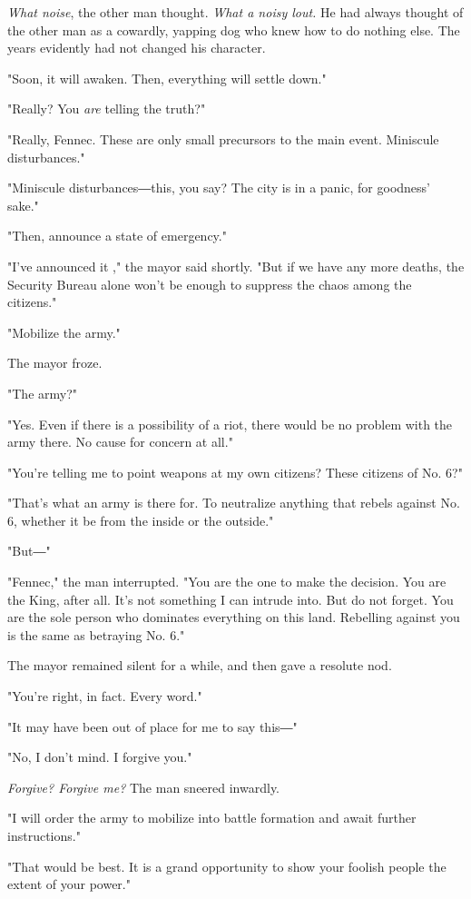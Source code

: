 \emph{What noise}, the other man thought. \emph{What a noisy lout.} He had always
thought of the other man as a cowardly, yapping dog who knew how to do
nothing else. The years evidently had not changed his character.

"Soon, it will awaken. Then, everything will settle down."

"Really? You \emph{are} telling the truth?"

"Really, Fennec. These are only small precursors to the main event.
Miniscule disturbances."

"Miniscule disturbances―this, you say? The city is in a panic, for
goodness' sake."

"Then, announce a state of emergency."

"I've announced it ," the mayor said shortly. "But if we have any more
deaths, the Security Bureau alone won't be enough to suppress the chaos
among the citizens."

"Mobilize the army."

The mayor froze.

"The army?"

"Yes. Even if there is a possibility of a riot, there would be no
problem with the army there. No cause for concern at all."

"You're telling me to point weapons at my own citizens? These citizens
of No. 6?"

"That's what an army is there for. To neutralize anything that rebels
against No. 6, whether it be from the inside or the outside."

"But―"

"Fennec," the man interrupted. "You are the one to make the decision.
You are the King, after all. It's not something I can intrude into. But
do not forget. You are the sole person who dominates everything on this
land. Rebelling against you is the same as betraying No. 6."

The mayor remained silent for a while, and then gave a resolute nod.

"You're right, in fact. Every word."

"It may have been out of place for me to say this―"

"No, I don't mind. I forgive you."

\emph{Forgive? Forgive me?} The man sneered inwardly.

"I will order the army to mobilize into battle formation and await
further instructions."

"That would be best. It is a grand opportunity to show your foolish
people the extent of your power."

